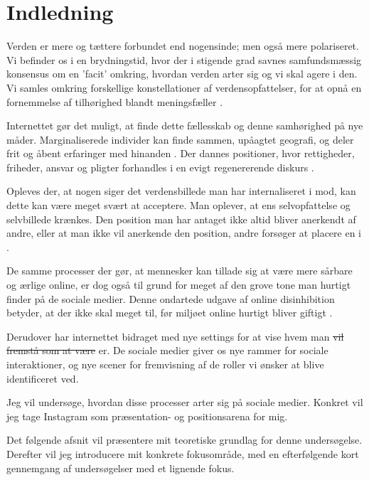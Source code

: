 \section{Indledning} 


Verden er mere og tættere forbundet end nogensinde; men også mere
polariseret.  Vi befinder os i en brydningstid, hvor der i
stigende grad savnes samfundsmæssig konsensus om en 'facit'
omkring, hvordan verden arter sig og vi skal agere i den. Vi
samles omkring forskellige konstellationer af verdensopfattelser,
for at opnå en fornemmelse af tilhørighed blandt
meningsfæller \autocite{sulerUniqueGroupsCyberspace1999}.

Internettet gør det muligt, at finde dette fællesskab og denne
samhørighed på nye måder. Marginaliserede individer kan finde
sammen, upåagtet geografi, og deler frit og åbent erfaringer med
hinanden \autocite[s. 184]{sulerOnlineDisinhibitionEffect2004}.  
Der dannes positioner, hvor rettigheder,
friheder, ansvar og pligter forhandles i en evigt regenererende
diskurs \autocite[s. 22]{harreromPositioningTheoryMoral1999}.

Opleves der, at nogen siger det verdensbillede man har
internaliseret i mod, kan dette kan være meget svært at acceptere.
Man oplever, at ens selvopfattelse og selvbillede krænkes. Den
position man har antaget ikke altid bliver anerkendt af andre,
eller at man ikke vil anerkende den position, andre forsøger at
placere en i \autocite[s30]{harreromPositioningTheoryMoral1999}.

De samme processer der gør, at mennesker kan tillade sig at være
mere sårbare og ærlige online, er dog også til grund for meget af
den grove tone man hurtigt finder på de sociale medier. Denne 
ondartede udgave af online disinhibition betyder, at der ikke skal
meget til, før miljøet online hurtigt bliver giftigt
\autocite{sulerOnlineDisinhibitionEffect2004}.

Derudover har internettet bidraget med nye settings for at vise 
hvem man \sout{vil fremstå som at være} er. De sociale medier 
giver os nye rammer for sociale interaktioner, og nye scener for 
fremvisning af de roller vi ønsker at blive identificeret ved.

Jeg vil undersøge, hvordan disse processer arter sig på sociale
medier. Konkret vil jeg tage Instagram som præsentation- og
positionsarena for mig.

Det følgende afsnit vil præsentere mit teoretiske grundlag for
denne undersøgelse. Derefter vil jeg introducere mit konkrete
fokusområde, med en efterfølgende kort gennemgang af undersøgelser
med et lignende fokus.

